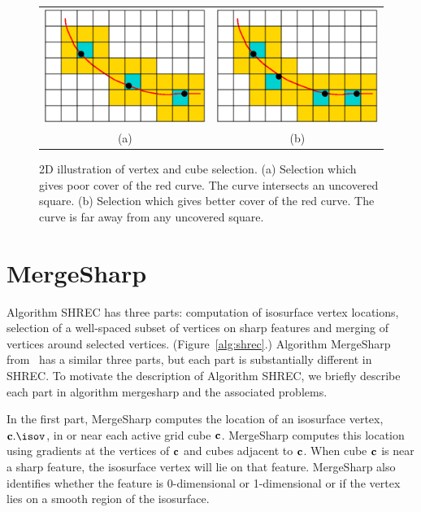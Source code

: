 \begin{figure}[t]
\centering

\begin{tabular}{cc}
\includegraphics[width=0.4\linewidth]{images/selectA.eps} \qquad &
\qquad
\includegraphics[width=0.4\linewidth]{images/selectB.eps} \\
(a) & (b)
\end{tabular}

\caption{2D illustration of vertex and cube selection.
(a) Selection which gives poor cover of the red curve.
The curve intersects an uncovered square.
(b) Selection which gives better cover of the red curve.
The curve is far away from any uncovered square.
}
\label{fig:select}
\end{figure}


\section{MergeSharp}
\label{section:mergesharp}

Algorithm SHREC has three parts:
computation of isosurface vertex locations, 
selection of a well-spaced subset of vertices on sharp features
and merging of vertices around selected vertices.
(Figure~\ref{alg:shrec}.)
Algorithm MergeSharp from~\cite{bw-cisec-13} 
has a similar three parts,
but each part is substantially different in SHREC.
To motivate the description of Algorithm SHREC,
we briefly describe each part in algorithm mergesharp
and the associated problems.

In the first part, 
MergeSharp computes the location of an isosurface vertex, $\cb.\isov$,
in or near each active grid cube $\mathbf{c}$.
MergeSharp computes this location using gradients at the vertices of $\mathbf{c}$
and cubes adjacent to $\mathbf{c}$.
When cube $\mathbf{c}$ is near a sharp feature,
the isosurface vertex will lie on that feature.
MergeSharp also identifies whether the feature 
is 0-dimensional or 1-dimensional
or if the vertex lies on a smooth region of the isosurface.

